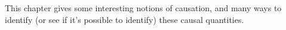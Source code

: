 This chapter gives some interesting notions of causation, and many ways to identify (or see if it's possible to identify) these causal quantities.


